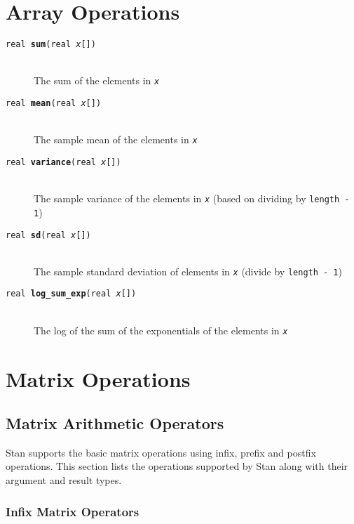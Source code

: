 \documentclass[10pt]{report}
\newcommand{\Stan}{Stan\xspace}
\newcommand{\code}[1]{{\tt #1}}
\newcommand{\fitem}[4]{\item[{\tt #1 {\bfseries #2}(#3)}]\mbox{ } \\[4pt] #4}
\newcommand{\farg}[1]{{\tt\slshape #1}}
\begin{document}
\chapter{Array Operations}


\begin{description}
\fitem{real}{sum}{real \farg{x}[]}
The sum of the elements in \farg{x}
%
\fitem{real}{mean}{real \farg{x}[]}
The sample mean of the elements in \farg{x}
%
\fitem{real}{variance}{real \farg{x}[]}
The sample variance of the elements in \farg{x} (based on
dividing by \code{length - 1})
%
\fitem{real}{sd}{real \farg{x}[]} The sample standard deviation of
elements in \farg{x} (divide by \code{length - 1})
%
\fitem{real}{log\_sum\_exp}{real \farg{x}[]}
The log of the sum of the exponentials of the elements in \farg{x}
\end{description}

\chapter{Matrix Operations}\label{matrix-operations.chapter}

\section{Matrix Arithmetic Operators}

\Stan supports the basic matrix operations using infix, prefix and
postfix operations.  This section lists the operations supported by
\Stan along with their argument and result types.

\subsection{Infix Matrix Operators}
\end{document}
